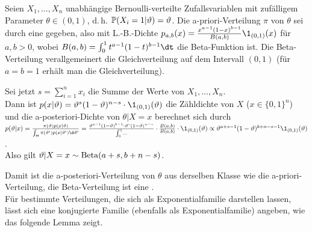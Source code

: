 \linie
\pagebreak

\begin{Bsp}
    Seien $X_1, \dotsc, X_n$ unabhängige Bernoulli-verteilte Zufallsvariablen mit
    zufälligem Parameter $\theta \in (0, 1)$, d.\,h.
    $\mathbb{P}(X_i = 1|\vartheta) = \vartheta$.
    Die a-priori-Verteilung $\pi$ von $\theta$ sei durch eine  gegeben,
    also mit L.-B.-Dichte $p_{a,b}(x) = \frac{x^{a-1} (1-x)^{b-1}}{B(a, b)} \1_{(0,1)}(x)$
    für $a, b > 0$,
    wobei $B(a, b) = \int_0^1 t^{a-1} (1-t)^{b-1} \dt$ die Beta-Funktion ist.
    Die Beta-Verteilung verallgemeinert die Gleichverteilung auf dem Intervall $(0, 1)$
    (für $a = b = 1$ erhält man die Gleichverteilung).
    
    Sei jetzt $s = \sum_{i=1}^n x_i$ die Summe der Werte von $X_1, \dotsc, X_n$.\\
    Dann ist $p(x|\theta) = \theta^s (1 - \theta)^{n-s} \cdot \1_{(0, 1)}(\theta)$
    die Zähldichte von $X$ ($x \in \{0, 1\}^n$) und die a-posteriori-Dichte von $\theta|X = x$
    berechnet sich durch\\
    $p(\theta|x) = \frac{\pi(\theta) p(x|\theta)}{\int_\Theta \pi(\theta') p(x|\theta') \d\theta'}
    = \frac{\theta^{a-1} (1 - \theta)^{b-1} \cdot \theta^s (1 - \theta)^{n-s}}{\int_0^1 \dots}
    \cdot \frac{B(a, b)}{B(a, b)} \cdot \1_{(0, 1)}(\theta)
    \propto \theta^{a+s-1} (1 - \theta)^{b+n-s-1} \1_{(0,1)}(\theta)$.\\
    Also gilt $\vartheta|X = x \sim \operatorname{Beta}(a + s, b + n - s)$.
\end{Bsp}

\begin{Bem}
    Damit ist die a-posteriori-Verteilung von $\theta$ aus derselben Klasse wie die
    a-priori-Verteilung, die Beta-Verteilung ist eine
    .\\
    Für bestimmte Verteilungen, die sich als Exponentialfamilie
    darstellen lassen, lässt sich eine konjugierte Familie
    (ebenfalls als Exponentialfamilie) angeben,
    wie das folgende Lemma zeigt.
\end{Bem}

\linie

